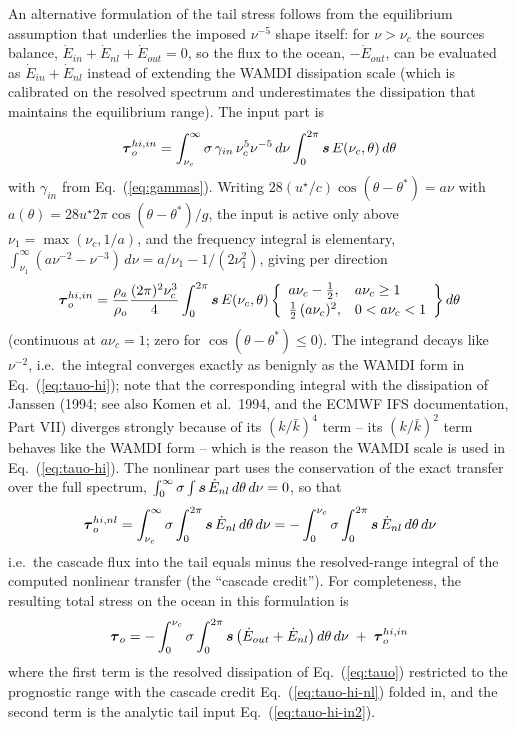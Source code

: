 \documentclass[12pt]{article}
\newcommand{\beq}  { \begin{eqnarray} }
\newcommand{\eeq}  { \end{eqnarray}}
\newcommand{\eq }  [1]{Eq.~(\ref{#1})}  %
\renewcommand{\v}[1]{{\mbox{\boldmath$ #1 $}}}  %
\begin{document}
An alternative formulation of the tail stress follows from the equilibrium
assumption that underlies the imposed $\nu^{-5}$ shape itself: for $\nu > \nu_c$
the sources balance, $\dot E_{in} + \dot E_{nl} + \dot E_{out} = 0$, so the
flux to the ocean, $-\dot E_{out}$, can be evaluated as
$\dot E_{in} + \dot E_{nl}$ instead of extending the WAMDI dissipation scale
(which is calibrated on the resolved spectrum and underestimates the
dissipation that maintains the equilibrium range). The input part is
\beq \label{eq:tauo-hi-in}
 \v \tau_o^{hi,in} = \int_{\nu_c}^\infty \sigma\, \gamma_{in}\, \nu_c^5 \nu^{-5}
   \, d\nu \int_0^{2\pi} \v s\, E(\nu_c,\theta)\, d\theta
\eeq
with $\gamma_{in}$ from \eq{eq:gammas}. Writing $28 (u^\star/c)
\cos(\theta - \theta^*) = a \nu$ with $a(\theta) = 28 u^\star 2\pi
\cos(\theta-\theta^*)/g$, the input is active only above
$\nu_1 = \max(\nu_c, 1/a)$, and the frequency integral is elementary,
$\int_{\nu_1}^\infty (a \nu^{-2} - \nu^{-3})\, d\nu = a/\nu_1 - 1/(2 \nu_1^2)$, giving
per direction
\beq \label{eq:tauo-hi-in2}
 \v \tau_o^{hi,in} = \frac{\rho_a}{\rho_o} \frac{(2\pi)^2 \nu_c^3}{4}
 \int_0^{2\pi} \v s\, E(\nu_c,\theta)
 \left\{ \begin{array}{ll} a \nu_c - \frac{1}{2}, & a \nu_c \ge 1\\[2pt]
 \frac{1}{2}\, (a \nu_c)^2, & 0 < a \nu_c < 1 \end{array} \right\}  d\theta
\eeq
(continuous at $a \nu_c = 1$; zero for $\cos(\theta-\theta^*) \le 0$). The
integrand decays like $\nu^{-2}$, i.e.\ the integral converges exactly as
benignly as the WAMDI form in \eq{eq:tauo-hi}; note that the corresponding
integral with the dissipation of Janssen (1994; see also Komen et al.\ 1994,
and the ECMWF IFS documentation, Part VII) diverges strongly because of its
$(k/\bar k)^4$ term -- its $(k/\bar k)^2$ term behaves like the WAMDI form --
which is the reason the WAMDI scale is used in \eq{eq:tauo-hi}. The nonlinear part uses the conservation of the exact
transfer over the full spectrum, $\int_0^\infty \sigma \int \v s\,
\dot E_{nl}\, d\theta\, d\nu = 0$, so that
\beq \label{eq:tauo-hi-nl}
 \v \tau_o^{hi,nl} = \int_{\nu_c}^\infty \sigma \int_0^{2\pi} \v s\,
 \dot E_{nl}\, d\theta\, d\nu
 = - \int_0^{\nu_c} \sigma \int_0^{2\pi} \v s\, \dot E_{nl}\, d\theta\, d\nu
\eeq
i.e.\ the cascade flux into the tail equals minus the resolved-range
integral of the computed nonlinear transfer (the ``cascade credit''). For
completeness, the resulting total stress on the ocean in this
formulation is
\beq \label{eq:tauo-in-tot}
 \v \tau_o = - \int_0^{\nu_c} \sigma \int_0^{2\pi} \v s
 \left( \dot E_{out} + \dot E_{nl} \right) d\theta\, d\nu
 \; + \; \v \tau_o^{hi,in}
\eeq
where the first term is the resolved dissipation of \eq{eq:tauo} restricted
to the prognostic range with the cascade credit \eq{eq:tauo-hi-nl} folded
in, and the second term is the analytic tail input \eq{eq:tauo-hi-in2}.
\end{document}

